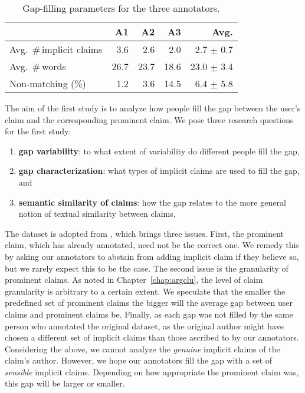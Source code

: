 \begin{table}[t]
{\small
\begin{center}
\begin{tabular}{lrrrr}
\toprule
& A1 & A2 & A3 & Avg.\\
\midrule
Avg.~\#\,implicit claims  & 3.6  & 2.6   & 2.0   &  \phantom{0}2.7 $\pm$ 0.7  \\
Avg.~\#\,words     & 26.7 & 23.7  & 18.6  &  23.0 $\pm$ 3.4      \\
Non-matching (\%)     & 1.2  & 3.6   & 14.5  &  \phantom{0}6.4 $\pm$ 5.8  \\
\bottomrule
\end{tabular}
\caption{Gap-filling parameters for the three annotators.}
\label{tab:var-annotators}
\end{center}}
\end{table}

The aim of the first study is to analyze how people fill 
the gap between the user's claim and the corresponding prominent claim. 
We pose three research questions for the first study: 
\begin{enumerate}[label=\arabic*)]
\item \textbf{gap variability}: to what extent of variability do different people fill the gap,
\item \textbf{gap characterization}: what types of implicit claims are used to fill the gap, and
\item \textbf{semantic similarity of claims}: how the gap relates to the more general notion of 
textual similarity between claims. 
\end{enumerate}
The dataset is adopted from \citet{hasan2014you}, which brings three issues. 
First, the prominent claim, which has already annotated, need not be
the correct one. 
We remedy this by asking our annotators to abstain from adding implicit claim if 
they believe so, but we rarely expect this to be the case. 
The second issue is the granularity of prominent claims. 
As noted in Chapter~\ref{chap:argclu}, the level of claim granularity is 
arbitrary to a certain extent. 
We speculate that the smaller the predefined set of prominent claims the 
bigger will the average gap between user claims and prominent claims be. 
Finally, as each gap was not filled by the same person who annotated the original 
dataset, as the original author might have chosen a different set of implicit claims than those
ascribed to by our annotators. 
Considering the above, we cannot analyze the \emph{genuine} implicit claims
of the claim's author. 
However, we hope our annotators fill the gap with a set of \emph{sensible} implicit 
claims. 
Depending on how appropriate the prominent claim was, this gap will be larger or smaller. 

